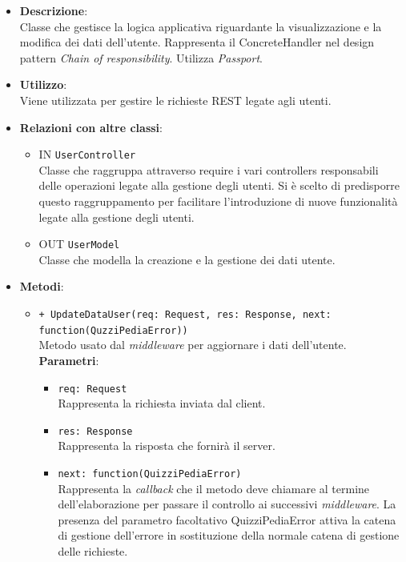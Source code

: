 \begin{itemize}
	\item 
	\textbf{Descrizione}:\\
	Classe che gestisce la logica applicativa riguardante la visualizzazione e la modifica dei dati dell'utente.
Rappresenta il ConcreteHandler nel design pattern \textit{Chain of responsibility}. Utilizza \textit{Passport}.
	\item
	\textbf{Utilizzo}:\\
	Viene utilizzata per gestire le richieste REST legate agli utenti.
	\item
	\textbf{Relazioni con altre classi}:
	\begin{itemize}
		\item
		IN \texttt{UserController} \\
		Classe che raggruppa attraverso require i vari controllers responsabili delle operazioni legate alla gestione degli utenti. Si è scelto di predisporre questo raggruppamento per facilitare l'introduzione di nuove funzionalità legate alla gestione degli utenti.
		\item
		OUT \texttt{UserModel} \\
		Classe che modella la creazione e la gestione dei dati utente.
	\end{itemize}
	\item
	\textbf{Metodi}:
	\begin{itemize}
		\item
		\texttt{+ UpdateDataUser(req: Request, res: Response, next: function(QuzziPediaError))} \\
		Metodo usato dal \textit{middleware} per aggiornare i dati dell’utente. \\
		\textbf{Parametri}:
		 \begin{itemize}
		  \item
			\texttt{req: Request} \\
			Rappresenta la richiesta inviata dal client.
		  \item
			\texttt{res: Response} \\
			Rappresenta la risposta che fornirà il server.
		  \item
		    \texttt{next: function(QuizziPediaError)} \\
			Rappresenta la \textit{callback} che il metodo deve chiamare al termine dell'elaborazione per passare il controllo ai successivi \textit{middleware}. La presenza del parametro facoltativo QuizziPediaError attiva la catena di gestione dell'errore in sostituzione della normale catena di gestione delle richieste.

\end{itemize}
\end{itemize}
\end{itemize}

